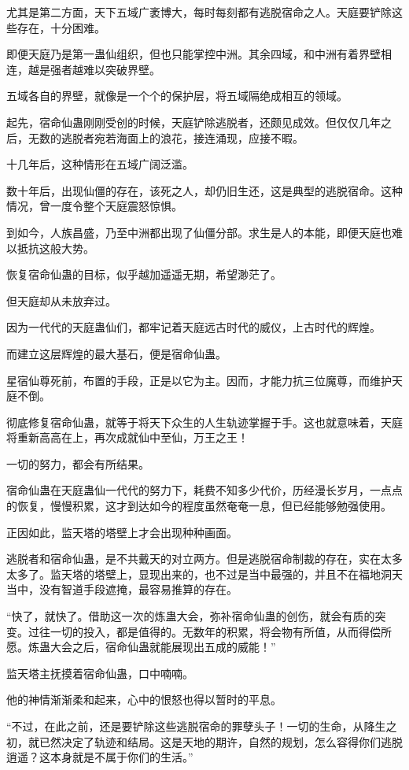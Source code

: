 \begin{this_body}
尤其是第二方面，天下五域广袤博大，每时每刻都有逃脱宿命之人。天庭要铲除这些存在，十分困难。

即便天庭乃是第一蛊仙组织，但也只能掌控中洲。其余四域，和中洲有着界壁相连，越是强者越难以突破界壁。

五域各自的界壁，就像是一个个的保护层，将五域隔绝成相互的领域。

起先，宿命仙蛊刚刚受创的时候，天庭铲除逃脱者，还颇见成效。但仅仅几年之后，无数的逃脱者宛若海面上的浪花，接连涌现，应接不暇。

十几年后，这种情形在五域广阔泛滥。

数十年后，出现仙僵的存在，该死之人，却仍旧生还，这是典型的逃脱宿命。这种情况，曾一度令整个天庭震怒惊惧。

到如今，人族昌盛，乃至中洲都出现了仙僵分部。求生是人的本能，即便天庭也难以抵抗这般大势。

恢复宿命仙蛊的目标，似乎越加遥遥无期，希望渺茫了。

但天庭却从未放弃过。

因为一代代的天庭蛊仙们，都牢记着天庭远古时代的威仪，上古时代的辉煌。

而建立这层辉煌的最大基石，便是宿命仙蛊。

星宿仙尊死前，布置的手段，正是以它为主。因而，才能力抗三位魔尊，而维护天庭不倒。

彻底修复宿命仙蛊，就等于将天下众生的人生轨迹掌握于手。这也就意味着，天庭将重新高高在上，再次成就仙中至仙，万王之王！

一切的努力，都会有所结果。

宿命仙蛊在天庭蛊仙一代代的努力下，耗费不知多少代价，历经漫长岁月，一点点的恢复，慢慢积累，这才到达如今的程度虽然奄奄一息，但已经能够勉强使用。

正因如此，监天塔的塔壁上才会出现种种画面。

逃脱者和宿命仙蛊，是不共戴天的对立两方。但是逃脱宿命制裁的存在，实在太多太多了。监天塔的塔壁上，显现出来的，也不过是当中最强的，并且不在福地洞天当中，没有智道手段遮掩，最容易推算的存在。

“快了，就快了。借助这一次的炼蛊大会，弥补宿命仙蛊的创伤，就会有质的突变。过往一切的投入，都是值得的。无数年的积累，将会物有所值，从而得偿所愿。炼蛊大会之后，宿命仙蛊就能展现出五成的威能！”

监天塔主抚摸着宿命仙蛊，口中喃喃。

他的神情渐渐柔和起来，心中的恨怒也得以暂时的平息。

“不过，在此之前，还是要铲除这些逃脱宿命的罪孽头子！一切的生命，从降生之初，就已然决定了轨迹和结局。这是天地的期许，自然的规划，怎么容得你们逃脱逍遥？这本身就是不属于你们的生活。”


\end{this_body}
